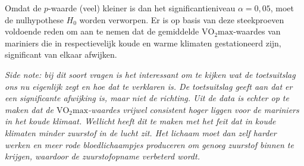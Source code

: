 \begin{enumerate}[label=(\alph*)]
{            Omdat de $p$-waarde (veel) kleiner is dan het significantieniveau $\alpha = 0,05$, moet de nulhypothese $H_0$ worden verworpen.
            Er is op basis van deze steekproeven voldoende reden om aan te nemen dat de gemiddelde $\text{VO}_2\text{max}$-waardes van mariniers die in respectievelijk koude en warme klimaten gestationeerd zijn, significant van elkaar afwijken.
            \begin{center}
            \end{center}

            {\itshape Side note: bij dit soort vragen is het interessant om te kijken wat de toetsuitslag ons nu eigenlijk zegt en hoe dat te verklaren is.
            De toetsuitslag geeft aan dat er een significante afwijking is, maar niet de richting.
            Uit de data is echter op te maken dat de $\text{VO}_2\text{max}$-waardes vrijwel consistent hoger liggen voor de mariniers in het koude klimaat.
            Wellicht heeft dit te maken met het feit dat in koude klimaten minder zuurstof in de lucht zit.
            Het lichaam moet dan zelf harder werken en meer rode bloedlichaampjes produceren om genoeg zuurstof binnen te krijgen, waardoor de zuurstofopname verbeterd wordt.}
        }    
    
    \end{enumerate}